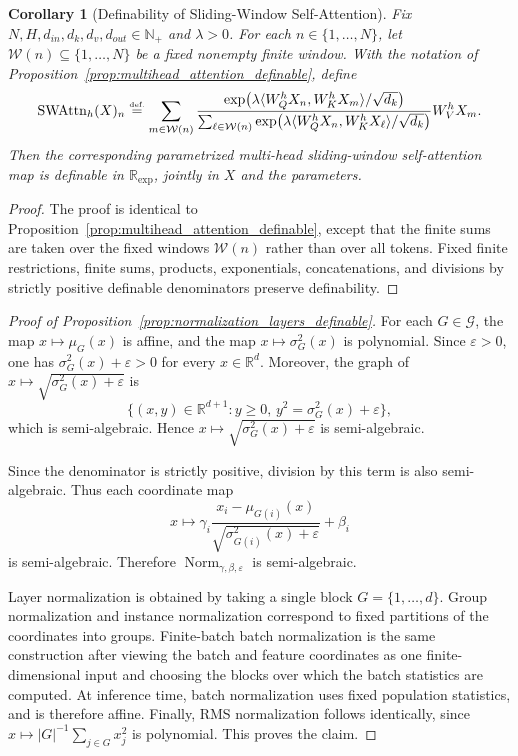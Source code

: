 \documentclass{article}
\newcommand{\eqdef}{\ensuremath{\stackrel{\mbox{\upshape\tiny def.}}{=}}}
\theoremstyle{plain}
\newtheorem{corollary}[theorem]{Corollary}
\theoremstyle{definition}
\theoremstyle{remark}
\theoremstyle{plain}
\numberwithin{thm}{section}
\theoremstyle{definition}
\numberwithin{equation}{section}
\begin{document}
\begin{corollary}[Definability of Sliding-Window Self-Attention]
\label{cor:sliding_window_attention_definable}
Fix $N,H,d_{in},d_k,d_v,d_{out}\in\mathbb{N}_+$ and $\lambda>0$.  For each
$n\in\{1,\dots,N\}$, let $\mathcal{W}(n)\subseteq\{1,\dots,N\}$ be a fixed
nonempty finite window.  With the notation of
Proposition~\ref{prop:multihead_attention_definable}, define
\[
    \operatorname{SWAttn}_h(X)_n
    \eqdef
    \sum_{m\in\mathcal{W}(n)}
    \frac{
        \exp\!\big(\lambda\langle W_Q^hX_n,W_K^hX_m\rangle/\sqrt{d_k}\big)
    }{
        \sum_{\ell\in\mathcal{W}(n)}
        \exp\!\big(\lambda\langle W_Q^hX_n,W_K^hX_\ell\rangle/\sqrt{d_k}\big)
    }
    W_V^hX_m .
\]
Then the corresponding parametrized multi-head sliding-window self-attention map
is definable in $\mathbb{R}_{\exp}$, jointly in $X$ and the parameters.
\end{corollary}

\begin{proof}
The proof is identical to Proposition~\ref{prop:multihead_attention_definable},
except that the finite sums are taken over the fixed windows
$\mathcal{W}(n)$ rather than over all tokens.  Fixed finite restrictions,
finite sums, products, exponentials, concatenations, and divisions by strictly
positive definable denominators preserve definability.
\end{proof}

\begin{proof}[{Proof of Proposition~\ref{prop:normalization_layers_definable}}]
For each $G\in\mathcal{G}$, the map $x\mapsto\mu_G(x)$ is affine, and the map $x\mapsto\sigma_G^2(x)$ is polynomial.  Since $\varepsilon>0$, one has
$
    \sigma_G^2(x)+\varepsilon>0
$
for every $x\in\mathbb{R}^d$.  Moreover, the graph of
$
    x\mapsto \sqrt{\sigma_G^2(x)+\varepsilon}
$
is
$$
    \Big\{
        (x,y)\in\mathbb{R}^{d+1}:
        y\ge 0,\,
        y^2=\sigma_G^2(x)+\varepsilon
    \Big\},
$$
which is semi-algebraic.  Hence $x\mapsto \sqrt{\sigma_G^2(x)+\varepsilon}$ is semi-algebraic.

Since the denominator is strictly positive, division by this term is also semi-algebraic.  Thus each coordinate map
$$
    x\mapsto
        \gamma_i
        \frac{x_i-\mu_{G(i)}(x)}
        {\sqrt{\sigma_{G(i)}^2(x)+\varepsilon}}
        +\beta_i
$$
is semi-algebraic.  Therefore $\operatorname{Norm}_{\gamma,\beta,\varepsilon}$ is semi-algebraic.

Layer normalization is obtained by taking a single block $G=\{1,\dots,d\}$.  Group normalization and instance normalization correspond to fixed partitions of the coordinates into groups.  Finite-batch batch normalization is the same construction after viewing the batch and feature coordinates as one finite-dimensional input and choosing the blocks over which the batch statistics are computed.  At inference time, batch normalization uses fixed population statistics, and is therefore affine.  Finally, RMS normalization follows identically, since $x\mapsto |G|^{-1}\sum_{j\in G}x_j^2$ is polynomial.  This proves the claim.
\end{proof}
\end{document}
